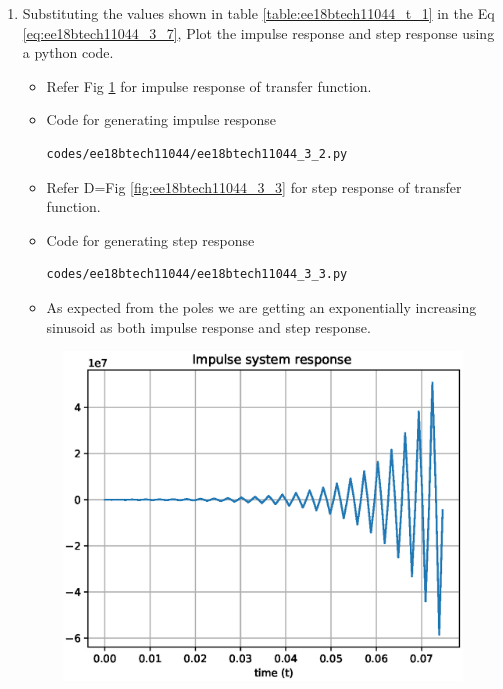 \begin{enumerate}[label=\arabic*.,ref=\theenumi]

\item Substituting the values shown in table \ref{table:ee18btech11044_t_1} in the Eq \ref{eq:ee18btech11044_3_7}, Plot the impulse response and step response using a python code.

\solution

\begin{itemize}
\item Refer Fig \ref{fig:ee18btech11044_3_2} for impulse response of transfer function.
\item Code for generating impulse response
\begin{lstlisting}
codes/ee18btech11044/ee18btech11044_3_2.py
\end{lstlisting}
\item Refer D=Fig \ref{fig:ee18btech11044_3_3} for step response of transfer function.
\item Code for generating step response
\begin{lstlisting}
codes/ee18btech11044/ee18btech11044_3_3.py
\end{lstlisting}
\item As expected from the poles we are getting an exponentially increasing sinusoid as both impulse response and step response.
\end{itemize}

\begin{figure}[!ht]
\centering
\includegraphics[width=\columnwidth]{./figs/ee18btech11044/ee18btech11044_3_2.eps}
\caption{}
\label{fig:ee18btech11044_3_2}
\end{figure}


\end{enumerate}
